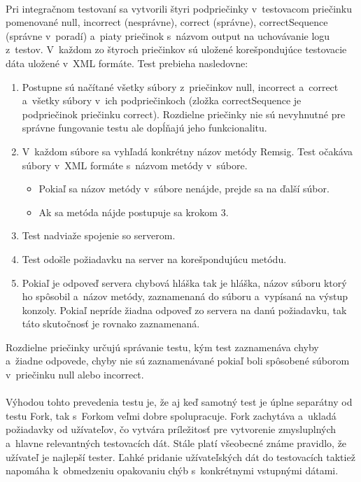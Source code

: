 \documentclass[
  digital, %
  table,   %
oneside,
  nolof,     %
  nolot,     %
]{fithesis3}
\begin{document}
 \paragraph{}
Pri integračnom testovaní sa  vytvorili štyri podpriečinky  v~testovacom priečinku pomenované null, incorrect (nesprávne), correct (správne), correctSequence (správne v~poradí) a~piaty priečinok s~názvom output na uchovávanie logu z~testov. V~každom zo štyroch priečinkov sú uložené korešpondujúce testovacie dáta uložené v~XML formáte. Test prebieha nasledovne: 
\begin{enumerate}
	\item Postupne sú načítané všetky súbory z~priečinkov null, incorrect a~correct a~všetky súbory v~ich podpriečinkoch (zložka correctSequence je podpriečinok priečinku correct). Rozdielne priečinky nie sú nevyhnutné pre správne fungovanie testu ale dopĺňajú jeho funkcionalitu. 
	\item V~každom súbore sa vyhľadá konkrétny názov metódy Remsig. Test očakáva súbory v~XML formáte s~názvom metódy v~súbore.
	\begin{itemize}
		\item Pokiaľ sa názov metódy v~súbore nenájde, prejde sa na ďalší súbor.
		\item Ak sa metóda nájde postupuje sa krokom 3.
	\end{itemize}
	\item Test nadviaže spojenie so serverom.
	\item Test odošle požiadavku na server na korešpondujúcu metódu.
	\item Pokiaľ je odpoveď servera chybová hláška  tak je hláška, názov súboru ktorý ho spôsobil a~názov metódy, zaznamenaná do súboru a~vypísaná na výstup konzoly. Pokiaľ nepríde žiadna odpoveď zo servera na danú požiadavku, tak táto skutočnosť je rovnako zaznamenaná.  

\end{enumerate}
Rozdielne priečinky určujú správanie testu, kým test zaznamenáva chyby a~žiadne odpovede, chyby nie sú zaznamenávané pokiaľ boli spôsobené súborom v~priečinku null alebo incorrect.
\paragraph{}
Výhodou tohto prevedenia testu je, že aj keď samotný test je úplne separátny od testu Fork, tak s~Forkom veľmi dobre spolupracuje. Fork zachytáva a~ukladá požiadavky od užívateľov, čo vytvára príležitosť pre vytvorenie zmysluplných a~hlavne relevantných testovacích dát. Stále platí všeobecné známe pravidlo, že užívateľ je najlepší tester. Ľahké pridanie užívateľských dát do testovacích taktiež napomáha k~obmedzeniu opakovaniu chýb s~konkrétnymi vstupnými dátami.      
\end{document}
